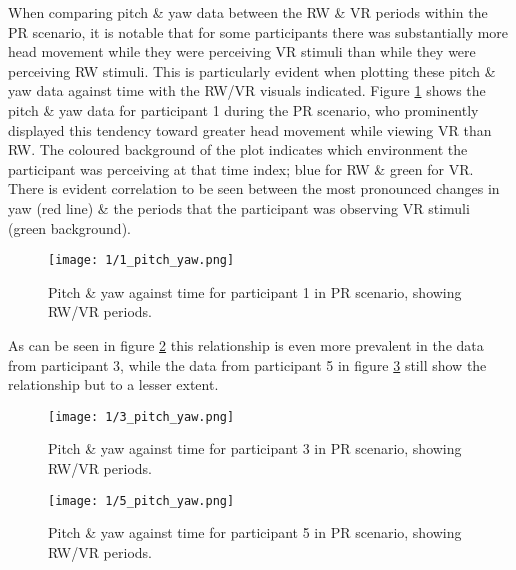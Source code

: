 When comparing pitch \& yaw data between the RW \& VR periods within the PR scenario, it is notable that for some participants there was substantially more head movement while they were perceiving VR stimuli than while they were perceiving RW stimuli. This is particularly evident when plotting these pitch \& yaw data against time with the RW/VR visuals indicated. Figure \ref{1_pitch_yaw.png} shows the pitch \& yaw data for participant 1 during the PR scenario, who prominently displayed this tendency toward greater head movement while viewing VR than RW. The coloured background of the plot indicates which environment the participant was perceiving at that time index; blue for RW \& green for VR. There is evident correlation to be seen between the most pronounced changes in yaw (red line) \& the periods that the participant was observing VR stimuli (green background).

\begin{figure}[h]
	\begin{center}
	\texttt{[image: 1/1\_pitch\_yaw.png]}
	\caption{Pitch \& yaw against time for participant 1 in PR scenario, showing RW/VR periods.}
	\label{1_pitch_yaw.png}
	\end{center}
\end{figure}

As can be seen in figure \ref{3_pitch_yaw.png} this relationship is even more prevalent in the data from participant 3, while the data from participant 5 in figure \ref{5_pitch_yaw.png} still show the relationship but to a lesser extent.

\begin{figure}[h]
	\begin{center}
	\texttt{[image: 1/3\_pitch\_yaw.png]}
	\caption{Pitch \& yaw against time for participant 3 in PR scenario, showing RW/VR periods.}
	\label{3_pitch_yaw.png}
	\end{center}
\end{figure}

\begin{figure}[h]
	\begin{center}
	\texttt{[image: 1/5\_pitch\_yaw.png]}
	\caption{Pitch \& yaw against time for participant 5 in PR scenario, showing RW/VR periods.}
	\label{5_pitch_yaw.png}
	\end{center}
\end{figure}

